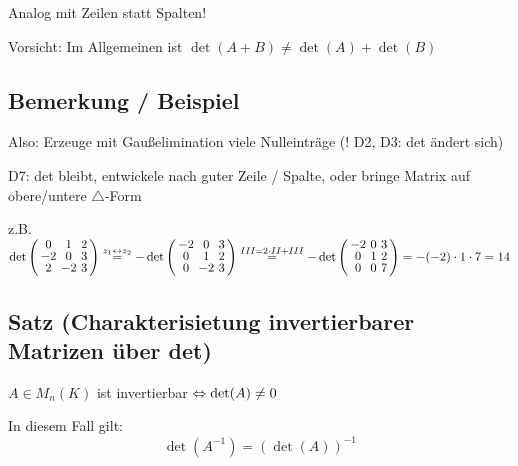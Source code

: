 Analog mit Zeilen statt Spalten!

Vorsicht: Im Allgemeinen ist $\det(A+B) \neq \det(A)+ \det(B)$


\subsection{Bemerkung / Beispiel}

Also: Erzeuge mit Gaußelimination viele Nulleinträge (! D2, D3: det ändert sich)
 
D7: det bleibt, entwickele nach guter Zeile / Spalte, oder bringe Matrix auf obere/untere $\triangle$-Form

z.B. 
\\$\det\aMatrix{ccc}{
0 & 1 & 2 \\
-2& 0 & 3 \\
2 & -2& 3}
	\stackrel{z_1\leftrightarrow z_2}{=}
	- \det\aMatrix{ccc}{
-2 & 0 & 3 \\
0  & 1 & 2 \\
0  & -2& 3}
	\stackrel{III=2\cdot II+III}{=}
	- \det \aMatrix{ccc}{
-2 & 0 & 3 \\
0  & 1 & 2 \\
0  & 0 & 7}
	= 
	- (-2) \cdot 1 \cdot 7 = 14$
 
 
\subsection{Satz (Charakterisietung invertierbarer Matrizen über det)}

$A \in M_n(K)$ ist invertierbar $\Leftrightarrow \det(A) \neq 0$

In diesem Fall gilt:
\[\det(A^{-1}) = (\det(A))^{-1} \]


